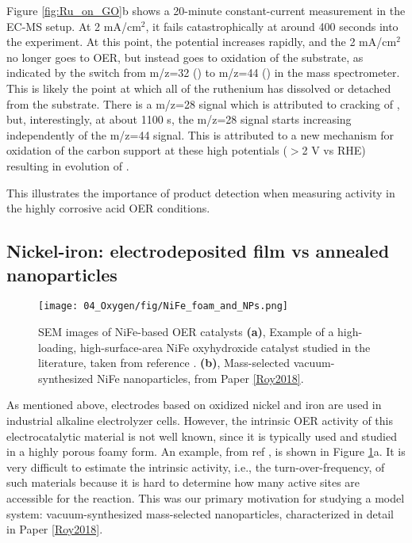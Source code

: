 Figure \ref{fig:Ru_on_GO}b shows a 20-minute constant-current measurement in the EC-MS setup. At 2 mA/cm$^2$, it fails catastrophically at around 400 seconds into the experiment. At this point, the potential increases rapidly, and the 2 mA/cm$^2$ no longer goes to OER, but instead goes to oxidation of the substrate, as indicated by the switch from m/z=32 () to m/z=44 () in the mass spectrometer. This is likely the point at which all of the ruthenium has dissolved or detached from the substrate. There is a m/z=28 signal which is attributed to cracking of , but, interestingly, at about 1100 s, the m/z=28 signal starts increasing independently of the m/z=44 signal. This is attributed to a new mechanism for oxidation of the carbon support at these high potentials ($>$2 V vs RHE) resulting in evolution of . 

This illustrates the importance of product detection when measuring activity in the highly corrosive acid OER conditions.

\subsection{Nickel-iron: electrodeposited film vs annealed nanoparticles}\label{subsec:NiFe}

\begin{figure}[h]
	\centering
	\texttt{[image: 04\_Oxygen/fig/NiFe\_foam\_and\_NPs.png]}
	\caption{SEM images of NiFe-based OER catalysts \textbf{(a)}, Example of a high-loading, high-surface-area NiFe oxyhydroxide catalyst studied in the literature, taken from reference . \textbf{(b)}, Mass-selected vacuum-synthesized NiFe nanoparticles, from Paper \ref{Roy2018}.}
	\label{fig:NiFe_foam_and_NPs}
\end{figure}

As mentioned above, electrodes based on oxidized nickel and iron are used in industrial alkaline electrolyzer cells. However, the intrinsic OER activity of this electrocatalytic material is not well known, since it is typically used and studied in a highly porous foamy form\cite{Dionigi2016b}. An example, from ref , is shown in Figure \ref{fig:NiFe_foam_and_NPs}a. It is very difficult to estimate the intrinsic activity, i.e., the turn-over-frequency, of such materials because it is hard to determine how many active sites are accessible for the reaction. This was our primary motivation for studying a model system: vacuum-synthesized mass-selected  nanoparticles, characterized in detail in Paper \ref{Roy2018}.

